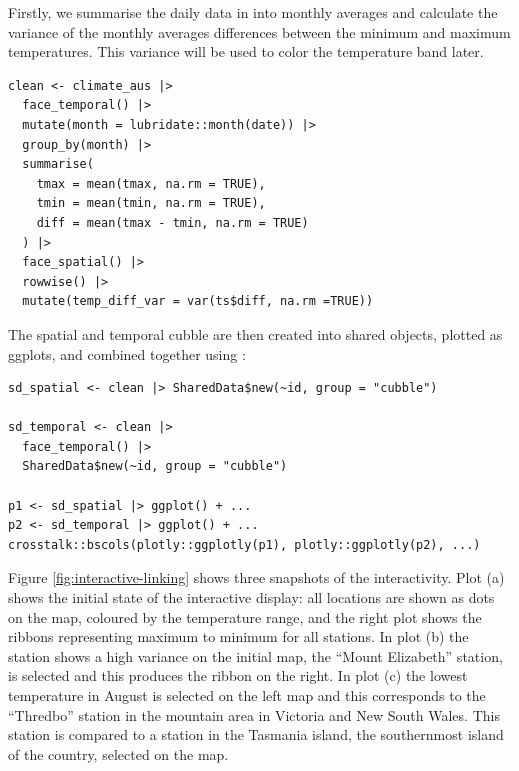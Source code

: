 \documentclass[
  shortnames]{jss}
\begin{document}
Firstly, we summarise the daily data in  into monthly averages and calculate the variance of the monthly averages differences between the minimum and maximum temperatures. This variance will be used to color the temperature band later.

\begin{verbatim}
clean <- climate_aus |>
  face_temporal() |> 
  mutate(month = lubridate::month(date)) |>
  group_by(month) |>
  summarise(
    tmax = mean(tmax, na.rm = TRUE),
    tmin = mean(tmin, na.rm = TRUE),
    diff = mean(tmax - tmin, na.rm = TRUE)
  ) |> 
  face_spatial() |> 
  rowwise() |>
  mutate(temp_diff_var = var(ts$diff, na.rm =TRUE))
\end{verbatim}

The spatial and temporal cubble are then created into shared  objects, plotted as ggplots, and combined together using :

\begin{verbatim}
sd_spatial <- clean |> SharedData$new(~id, group = "cubble")

sd_temporal <- clean |> 
  face_temporal() |> 
  SharedData$new(~id, group = "cubble")
  
p1 <- sd_spatial |> ggplot() + ...
p2 <- sd_temporal |> ggplot() + ...
crosstalk::bscols(plotly::ggplotly(p1), plotly::ggplotly(p2), ...)
\end{verbatim}

Figure \ref{fig:interactive-linking} shows three snapshots of the interactivity. Plot (a) shows the initial state of the interactive display: all locations are shown as dots on the map, coloured by the temperature range, and the right plot shows the ribbons representing maximum to minimum for all stations. In plot (b) the station shows a high variance on the initial map, the ``Mount Elizabeth'' station, is selected and this produces the ribbon on the right. In plot (c) the lowest temperature in August is selected on the left map and this corresponds to the ``Thredbo'' station in the mountain area in Victoria and New South Wales. This station is compared to a station in the Tasmania island, the southernmost island of the country, selected on the map.
\end{document}

